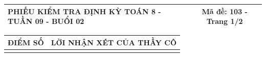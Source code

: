 \documentclass[12pt,a4paper]{article}
\begin{document}
\newpage
\noindent
\begin{tabularx}{\linewidth}{|X|c|}
\hline
\textbf{PHIẾU KIỂM TRA ĐỊNH KỲ TOÁN 8 - TUẦN 09 - BUỔI 02} & \textbf{Mã đề: 103 - Trang 1/2} \\
\hline
\end{tabularx}

\vspace{1.2mm}

\noindent
\begin{tabularx}{\linewidth}{|p{3.2cm}|X|}
\hline
\centering\textbf{ĐIỂM SỐ} & \centering\textbf{LỜI NHẬN XÉT CỦA THẦY CÔ} \tabularnewline
\hline
\rule{0pt}{1.8cm} & \tabularnewline
\hline
\end{tabularx}
\end{document}
